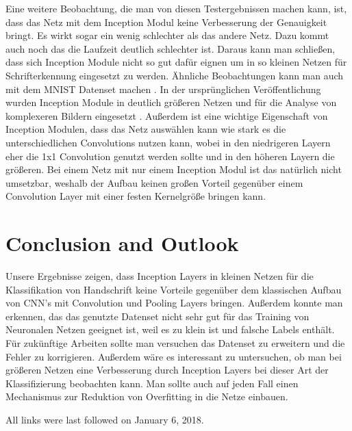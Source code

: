 \documentclass[runningheads,a4paper]{llncs}[2015/06/24]
\begin{document}
Eine weitere Beobachtung, die man von diesen Testergebnissen machen kann, ist, dass das Netz mit dem Inception Modul keine Verbesserung der Genauigkeit bringt. Es wirkt sogar ein wenig schlechter als das andere Netz. Dazu kommt auch noch das die Laufzeit deutlich schlechter ist. Daraus kann man schließen, dass sich Inception Module nicht so gut dafür eignen um in so kleinen Netzen für Schrifterkennung eingesetzt zu werden. Ähnliche Beobachtungen kann man auch mit dem MNIST Datenset machen \cite{inception_blog}. In der ursprünglichen Veröffentlichung wurden Inception Module in deutlich größeren Netzen und für die Analyse von komplexeren Bildern eingesetzt \cite{inception_paper}. Außerdem ist eine wichtige Eigenschaft von Inception Modulen, dass das Netz auswählen kann wie stark es die unterschiedlichen Convolutions nutzen kann, wobei in den niedrigeren Layern eher die 1x1 Convolution genutzt werden sollte und in den höheren Layern die größeren. Bei einem Netz mit nur einem Inception Modul ist das natürlich nicht umsetzbar, weshalb der Aufbau keinen großen Vorteil gegenüber einem Convolution Layer mit einer festen Kernelgröße bringen kann.

\section{Conclusion and Outlook}
Unsere Ergebnisse zeigen, dass Inception Layers in kleinen Netzen für die Klassifikation von Handschrift keine Vorteile gegenüber dem klassischen Aufbau von CNN's mit Convolution und Pooling Layers bringen. Außerdem konnte man erkennen, das das genutzte Datenset nicht sehr gut für das Training von Neuronalen Netzen geeignet ist, weil es zu klein ist und falsche Labels enthält.\\
Für zukünftige Arbeiten sollte man versuchen das Datenset zu erweitern und die Fehler zu korrigieren. Außerdem wäre es interessant zu untersuchen, ob man bei größeren Netzen eine Verbesserung durch Inception Layers bei dieser Art der Klassifizierung beobachten kann. Man sollte auch auf jeden Fall einen Mechanismus zur Reduktion von Overfitting in die Netze einbauen.






All links were last followed on January 6, 2018.
\end{document}
